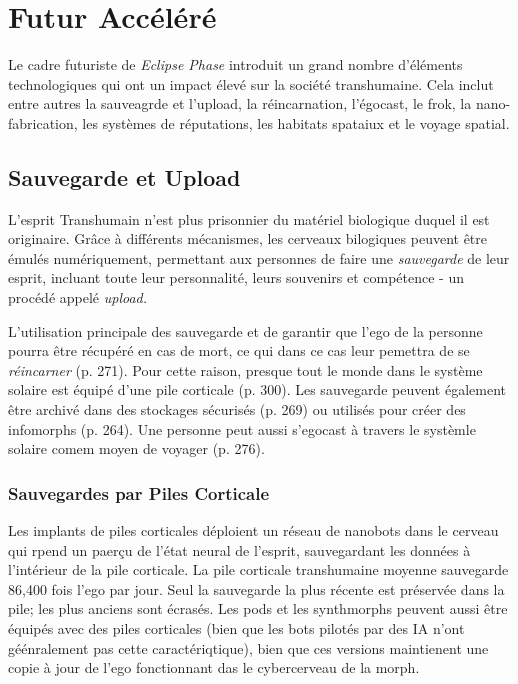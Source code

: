 



\chapter{Futur Accéléré} \label{cha:accelerated-future} 



















Le cadre futuriste de \textit{Eclipse Phase} introduit un grand nombre d'éléments technologiques qui ont un impact élevé sur la société transhumaine. Cela inclut entre autres la sauveagrde et l'upload, la réincarnation, l'égocast, le frok, la nano-fabrication, les systèmes de réputations, les habitats spataiux et le voyage spatial. 

\section{Sauvegarde et Upload} 

L'esprit Transhumain n'est plus prisonnier du matériel biologique duquel il est originaire. Grâce à différents mécanismes, les cerveaux bilogiques peuvent être émulés numériquement, permettant aux personnes de faire une \textit{sauvegarde} de leur esprit, incluant toute leur personnalité, leurs souvenirs et compétence - un procédé appelé \textit{upload.} 

L'utilisation principale des sauvegarde et de garantir que l'ego de la personne pourra être récupéré en cas de mort, ce qui dans ce cas leur pemettra de se \textit{réincarner} (p. 271). Pour cette raison, presque tout le monde dans le système solaire est équipé d'une pile corticale (p. 300). Les sauvegarde peuvent également être archivé dans des stockages sécurisés (p. 269) ou utilisés pour créer des infomorphs (p. 264). Une personne peut aussi s'egocast à travers le systèmle solaire comem moyen de voyager (p. 276). 

\subsection{Sauvegardes par Piles Corticale} 

Les implants de piles corticales déploient un réseau de nanobots dans le cerveau qui rpend un paerçu de l'état neural de l'esprit, sauvegardant les données à l'intérieur de la pile corticale. La pile corticale transhumaine moyenne sauvegarde 86,400 fois l'ego par jour. Seul la sauvegarde la plus récente est préservée dans la pile; les plus anciens sont écrasés. Les pods et les synthmorphs peuvent aussi être équipés avec des piles corticales (bien que les bots pilotés par des IA n'ont géénralement pas cette caractériqtique), bien que ces versions maintienent une copie à jour de l'ego fonctionnant das le cybercerveau de la morph. 


